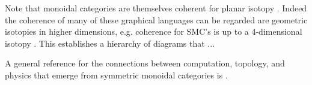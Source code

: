 Note that monoidal categories are themselves coherent for planar isotopy \cite{joyal1991geometry}. Indeed the coherence of many of these graphical languages can be regarded are geometric isotopies in higher dimensions, e.g. coherence for SMC's is up to a 4-dimensional isotopy \cite{selinger2011survey}. This establishes a hierarchy of diagrams that ...

A general reference for the connections between computation, topology, and physics that emerge from symmetric monoidal categories is \cite{baez2011physics}.

